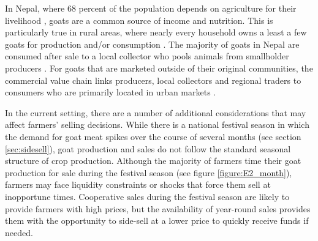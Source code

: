 \documentclass[11pt]{article}
\begin{document}
In Nepal, where 68 percent of the population depends on agriculture for their livelihood \citep{international_labor_organization_ilo_2016}, goats are a common source of income and nutrition. This is particularly true in rural areas, where nearly every household owns a least a few goats for production and/or consumption \citep{upreti_food_2009}. The majority of goats in Nepal are consumed after sale to a local collector who pools animals from smallholder producers \citep{heifer_international_nepal_study_2012}. For goats that are marketed outside of their original communities, the commercial value chain links producers, local collectors and regional traders to consumers who are primarily located in urban markets \citep{heifer_international_nepal_study_2012}. %

In the current setting, there are a number of additional considerations that may affect farmers' selling decisions. While there is a national festival season in which the demand for goat meat spikes over the course of several months (see section \ref{sec:sidesell}), goat production and sales do not follow the standard seasonal structure of crop production. Although the majority of farmers time their goat production for sale during the festival season (see figure \ref{figure:E2_month}), farmers may face liquidity constraints or shocks that force them sell at inopportune times. Cooperative sales during the festival season are likely to provide farmers with high prices, but the availability of year-round sales provides them with the opportunity to side-sell at a lower price to quickly receive funds if needed. 
\end{document}

